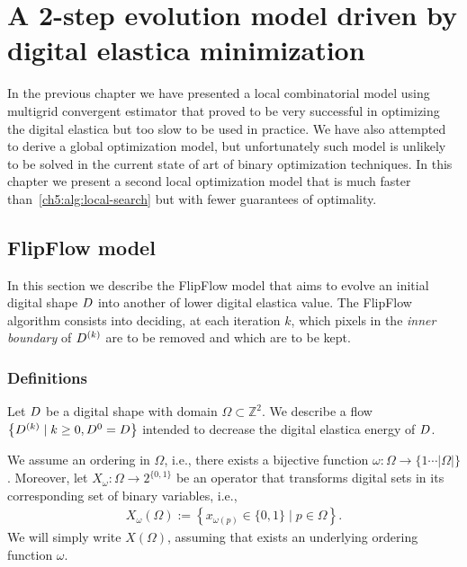 \chapter{A 2-step evolution model driven by digital elastica minimization}
\label{chapter:flip-flow}

In the previous chapter we have presented a local combinatorial model using multigrid convergent estimator that proved to be very successful in optimizing the digital elastica but too slow to be used in practice. We have also attempted to derive a global optimization model, but unfortunately such model is unlikely to be solved in the current state of art of binary optimization techniques. In this chapter we present a second local optimization model that is much faster than~\cref{ch5:alg:local-search} but with fewer guarantees of optimality.



\section{FlipFlow model}
\label{ch6:sec:flipflow-model}

In this section we describe the FlipFlow model that aims to evolve an initial digital shape $D$ into another of lower digital elastica value. The FlipFlow algorithm consists into deciding, at each iteration $k$, which pixels in the \emph{inner boundary} of $D^{(k)}$ are to be removed  and which are to be kept. 

\subsection{Definitions}
\label{ch6:subsec:definitions}

Let $D$ be a digital shape with domain $\Omega \subset \mathbb{Z}^2$. We describe a flow $\left \{ D^{(k)} \; | \; k \geq 0, D^{0} = D \right\}$ intended to decrease the digital elastica energy of $D$.

We assume an ordering in $\Omega$, i.e., there exists a bijective function $\omega : \Omega \rightarrow \{1 \cdots |\Omega| \}$. Moreover, let $X_{\omega}:\Omega \rightarrow 2^{\{0,1\}}$ be an operator that transforms digital sets in its corresponding set of binary variables, i.e.,
\begin{align*}
	X_{\omega}(\Omega) := \left\{ x_{\omega(p)} \in \{0,1\} \; | \; p \in \Omega \right\}.
\end{align*}
%
We will simply write $X(\Omega)$, assuming that exists an underlying ordering function $\omega$.

